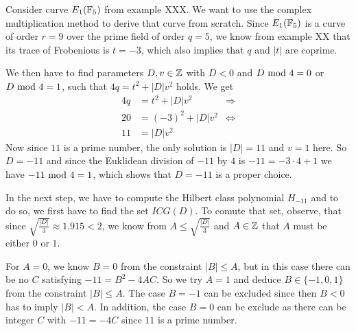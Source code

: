 \begin{example} Consider curve $E_1(\mathbb{F}_5)$ from example XXX. We want to use the complex multiplication method to derive that curve from scratch. Since $E_1(\mathbb{F}_5)$ is a curve of order $r=9$ over the prime field of order $q=5$, we know from example XX that its trace of Frobenious is $t=-3$, which also implies that $q$ and $|t|$ are coprime. 

We then have to find parameters $D,v\in\mathbb{Z}$ with $D<0$ and $D \text{ mod } 4=0$ or $D \text{ mod } 4=1$, such that $4q = t^2+ |D|v^2$ holds. We get
\begin{align*}
4q & = t^2+ |D|v^2 & \Rightarrow \\
20 & = (-3)^2 + |D|v^2 & \Leftrightarrow \\
11 & = |D|v^2
\end{align*}
Now since $11$ is a prime number, the only solution is $|D|=11$ and $v=1$ here. So $D=-11$ and since the Euklidean division of $-11$ by $4$ is $-11 = -3\cdot 4 +1$ we have $-11 \text{ mod } 4=1$, which shows that $D=-11$ is a proper choice.

In the next step, we have to compute the Hilbert class polynomial $H_{-11}$ and to do so, we first have to find the set $ICG(D)$. To comute that set, observe, that since $\sqrt{\frac{|D|}{3}}\approx 1.915<2$, we know from $A\leq \sqrt{\frac{|D|}{3}}$ and $A\in\mathbb{Z}$ that $A$ must be either $0$ or $1$. 

For $A=0$, we know $B=0$ from the constraint $|B|\leq A$, but in this case there can be no $C$ satisfying $-11= B^2 -4AC$. So we try $A=1$ and deduce $B\in\{-1,0,1\}$ from the constraint $|B|\leq A$. The case $B=-1$ can be excluded since then $B<0$ has to imply $|B|<A$. In addition, the case $B=0$ can be exclude as there can be integer $C$ with $-11 = -4C$ since $11$ is a prime number. 


\end{example}
